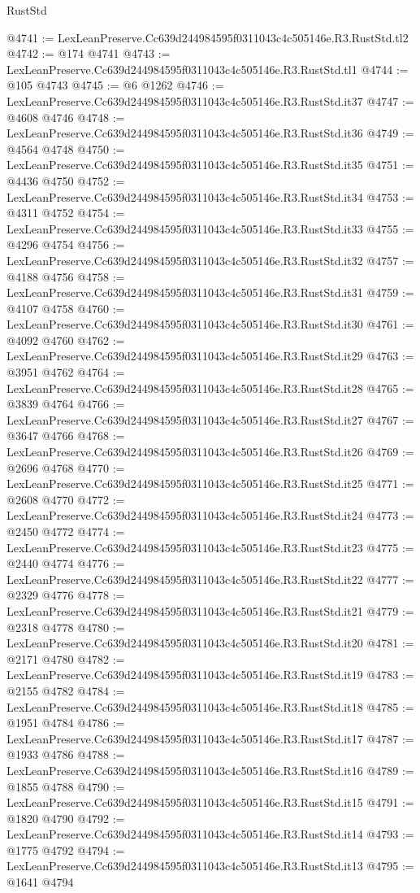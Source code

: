 \begin{lexlean}{RustStd}
\begin{coremodule}
@4741 := LexLeanPreserve.Cc639d244984595f0311043c4c505146e.R3.RustStd.tl2
@4742 := @174 @4741
@4743 := LexLeanPreserve.Cc639d244984595f0311043c4c505146e.R3.RustStd.tl1
@4744 := @105 @4743
@4745 := @6 @1262
@4746 := LexLeanPreserve.Cc639d244984595f0311043c4c505146e.R3.RustStd.it37
@4747 := @4608 @4746
@4748 := LexLeanPreserve.Cc639d244984595f0311043c4c505146e.R3.RustStd.it36
@4749 := @4564 @4748
@4750 := LexLeanPreserve.Cc639d244984595f0311043c4c505146e.R3.RustStd.it35
@4751 := @4436 @4750
@4752 := LexLeanPreserve.Cc639d244984595f0311043c4c505146e.R3.RustStd.it34
@4753 := @4311 @4752
@4754 := LexLeanPreserve.Cc639d244984595f0311043c4c505146e.R3.RustStd.it33
@4755 := @4296 @4754
@4756 := LexLeanPreserve.Cc639d244984595f0311043c4c505146e.R3.RustStd.it32
@4757 := @4188 @4756
@4758 := LexLeanPreserve.Cc639d244984595f0311043c4c505146e.R3.RustStd.it31
@4759 := @4107 @4758
@4760 := LexLeanPreserve.Cc639d244984595f0311043c4c505146e.R3.RustStd.it30
@4761 := @4092 @4760
@4762 := LexLeanPreserve.Cc639d244984595f0311043c4c505146e.R3.RustStd.it29
@4763 := @3951 @4762
@4764 := LexLeanPreserve.Cc639d244984595f0311043c4c505146e.R3.RustStd.it28
@4765 := @3839 @4764
@4766 := LexLeanPreserve.Cc639d244984595f0311043c4c505146e.R3.RustStd.it27
@4767 := @3647 @4766
@4768 := LexLeanPreserve.Cc639d244984595f0311043c4c505146e.R3.RustStd.it26
@4769 := @2696 @4768
@4770 := LexLeanPreserve.Cc639d244984595f0311043c4c505146e.R3.RustStd.it25
@4771 := @2608 @4770
@4772 := LexLeanPreserve.Cc639d244984595f0311043c4c505146e.R3.RustStd.it24
@4773 := @2450 @4772
@4774 := LexLeanPreserve.Cc639d244984595f0311043c4c505146e.R3.RustStd.it23
@4775 := @2440 @4774
@4776 := LexLeanPreserve.Cc639d244984595f0311043c4c505146e.R3.RustStd.it22
@4777 := @2329 @4776
@4778 := LexLeanPreserve.Cc639d244984595f0311043c4c505146e.R3.RustStd.it21
@4779 := @2318 @4778
@4780 := LexLeanPreserve.Cc639d244984595f0311043c4c505146e.R3.RustStd.it20
@4781 := @2171 @4780
@4782 := LexLeanPreserve.Cc639d244984595f0311043c4c505146e.R3.RustStd.it19
@4783 := @2155 @4782
@4784 := LexLeanPreserve.Cc639d244984595f0311043c4c505146e.R3.RustStd.it18
@4785 := @1951 @4784
@4786 := LexLeanPreserve.Cc639d244984595f0311043c4c505146e.R3.RustStd.it17
@4787 := @1933 @4786
@4788 := LexLeanPreserve.Cc639d244984595f0311043c4c505146e.R3.RustStd.it16
@4789 := @1855 @4788
@4790 := LexLeanPreserve.Cc639d244984595f0311043c4c505146e.R3.RustStd.it15
@4791 := @1820 @4790
@4792 := LexLeanPreserve.Cc639d244984595f0311043c4c505146e.R3.RustStd.it14
@4793 := @1775 @4792
@4794 := LexLeanPreserve.Cc639d244984595f0311043c4c505146e.R3.RustStd.it13
@4795 := @1641 @4794

\end{coremodule}
\end{lexlean}
